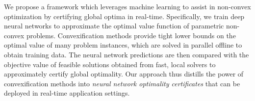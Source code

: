 \documentclass[10pt]{article} %
\theoremstyle{plain}
\theoremstyle{definition}
\theoremstyle{remark}
\begin{document}
We propose a framework which leverages machine learning to assist in non-convex optimization by certifying global optima in real-time. Specifically, we train deep neural networks to approximate the optimal value function of parametric non-convex problems. 
Convexification methods provide tight lower bounds on the optimal value of many problem instances, which are solved in parallel offline to obtain training data. The neural network predictions are then compared with the objective value of feasible solutions obtained from fast, local solvers to approximately certify global optimality.
Our approach thus distills the power of convexification methods into \textit{neural network optimality certificates} that can be deployed in real-time application settings.



\end{document}
